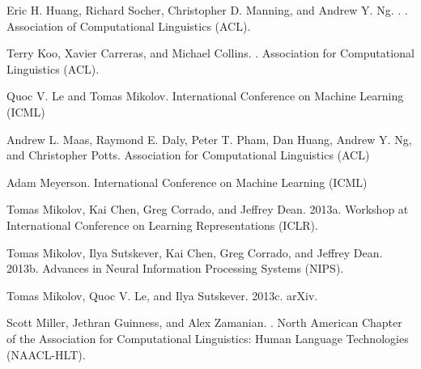 \documentclass[11pt,a4paper]{article}
\begin{document}
\begin{thebibliography}{}
Eric H. Huang, Richard Socher, Christopher D. Manning, and Andrew Y. Ng.
.
.
\newblock Association of Computational Linguistics (ACL).

Terry Koo, Xavier Carreras, and Michael Collins.
.
\newblock Association for Computational Linguistics (ACL).

Quoc V. Le and Tomas Mikolov.
\newblock International Conference on Machine Learning (ICML)

Andrew L. Maas, Raymond E. Daly, Peter T. Pham, Dan Huang, Andrew Y. Ng, and Christopher Potts.
\newblock Association for Computational Linguistics (ACL)

Adam Meyerson.
\newblock International Conference on Machine Learning (ICML)

Tomas Mikolov, Kai Chen, Greg Corrado, and Jeffrey Dean.
\newblock 2013a.
\newblock Workshop at International Conference on Learning Representations (ICLR).

Tomas Mikolov, Ilya Sutskever, Kai Chen, Greg Corrado, and Jeffrey Dean.
\newblock 2013b.
\newblock Advances in Neural Information Processing Systems (NIPS).

 Tomas Mikolov, Quoc V. Le, and Ilya Sutskever.
\newblock 2013c.
\newblock arXiv.

Scott Miller, Jethran Guinness, and Alex Zamanian.
.
\newblock North American Chapter of the Association for Computational Linguistics: Human Language Technologies (NAACL-HLT).


\end{thebibliography}
\end{document}
